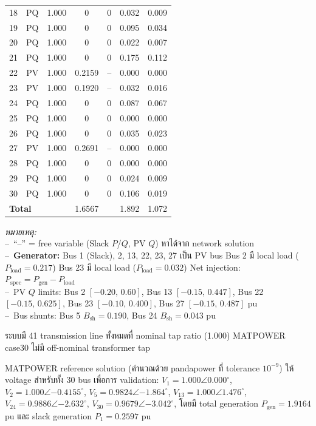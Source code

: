 \documentclass[12pt,a4paper]{article}
\begin{document}
\begin{table}[H]
\begin{tabular}{ccccccc}
18 & PQ    & 1.000 & 0     & 0   & 0.032 & 0.009 \\
19 & PQ    & 1.000 & 0     & 0   & 0.095 & 0.034 \\
20 & PQ    & 1.000 & 0     & 0   & 0.022 & 0.007 \\
21 & PQ    & 1.000 & 0     & 0   & 0.175 & 0.112 \\
22 & PV    & 1.000 & 0.2159 & -- & 0.000 & 0.000 \\
23 & PV    & 1.000 & 0.1920 & -- & 0.032 & 0.016 \\
24 & PQ    & 1.000 & 0     & 0   & 0.087 & 0.067 \\
25 & PQ    & 1.000 & 0     & 0   & 0.000 & 0.000 \\
26 & PQ    & 1.000 & 0     & 0   & 0.035 & 0.023 \\
27 & PV    & 1.000 & 0.2691 & -- & 0.000 & 0.000 \\
28 & PQ    & 1.000 & 0     & 0   & 0.000 & 0.000 \\
29 & PQ    & 1.000 & 0     & 0   & 0.024 & 0.009 \\
30 & PQ    & 1.000 & 0     & 0   & 0.106 & 0.019 \\
\midrule
\multicolumn{2}{l}{\textbf{Total}} & & 1.6567 & & 1.892 & 1.072 \\
\bottomrule
\end{tabular}
\end{table}

\begin{flushleft}
\footnotesize
\textit{หมายเหตุ:}\\[2pt]
--\ ``--'' = free variable (Slack $P$/$Q$, PV $Q$) หาได้จาก network solution\\[2pt]
--\ \textbf{Generator:} Bus 1 (Slack), 2, 13, 22, 23, 27 เป็น PV bus Bus 2 มี local load ($P_{\text{load}}=0.217$) Bus 23 มี local load ($P_{\text{load}}=0.032$) Net injection: $P_{\text{spec}} = P_{\text{gen}} - P_{\text{load}}$\\[2pt]
--\ PV $Q$ limits: Bus 2 $[-0.20,\,0.60]$, Bus 13 $[-0.15,\,0.447]$, Bus 22 $[-0.15,\,0.625]$, Bus 23 $[-0.10,\,0.400]$, Bus 27 $[-0.15,\,0.487]$ pu\\[2pt]
--\ Bus shunts: Bus 5 $B_{\text{sh}}=0.190$, Bus 24 $B_{\text{sh}}=0.043$ pu
\end{flushleft}

ระบบมี 41 transmission line ทั้งหมดที่ nominal tap ratio (1.000) MATPOWER case30 ไม่มี off-nominal transformer tap

MATPOWER reference solution (คำนวณด้วย pandapower ที่ tolerance $10^{-9}$) ให้ voltage สำหรับทั้ง 30 bus เพื่อการ validation:
$V_1 = 1.000\angle 0.000^\circ$, $V_2 = 1.000\angle{-0.4155}^\circ$, $V_5 = 0.9824\angle{-1.864}^\circ$,
$V_{13} = 1.000\angle 1.476^\circ$, $V_{24} = 0.9886\angle{-2.632}^\circ$, $V_{30} = 0.9679\angle{-3.042}^\circ$,
โดยมี total generation $P_{\text{gen}} = 1.9164$ pu และ slack generation $P_1 = 0.2597$ pu
\end{document}
